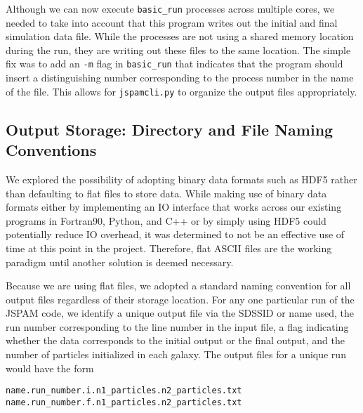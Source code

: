 Although we can now execute \texttt{basic\_run} processes across multiple cores,
we needed to take into account that this program writes out the initial and
final simulation data file. While the processes are not using a shared memory
location during the run, they are writing out these files to the same location.
The simple fix was to add an \texttt{-m} flag in \texttt{basic\_run} that
indicates that the program should insert a distinguishing number corresponding
to the process number in the name of the file. This allows for
\texttt{jspamcli.py} to organize the output files appropriately.


\subsection{Output Storage: Directory and File Naming Conventions}
We explored the possibility of adopting binary data
formats such as HDF5 rather than defaulting to flat files to store data.
While making use of binary data formats either by implementing an
IO interface that works across our existing programs in Fortran90, Python,
and C++ or by simply using HDF5 could potentially reduce IO overhead, it was
determined to not be an effective use of time at this point in the project.
Therefore, flat ASCII files are the working paradigm until another
solution is deemed necessary.

Because we are using flat files, we adopted a standard naming convention for all
output files regardless of their storage location. For any one particular run of
the JSPAM code, we identify a unique output file via the SDSSID or name used,
the run number corresponding to the line number in the input file, a flag
indicating whether the data corresponds to the initial output or the final
output, and the number of particles initialized in each galaxy. The output files
for a unique run would have the form

\begin{verbatim}
name.run_number.i.n1_particles.n2_particles.txt
name.run_number.f.n1_particles.n2_particles.txt
\end{verbatim}

